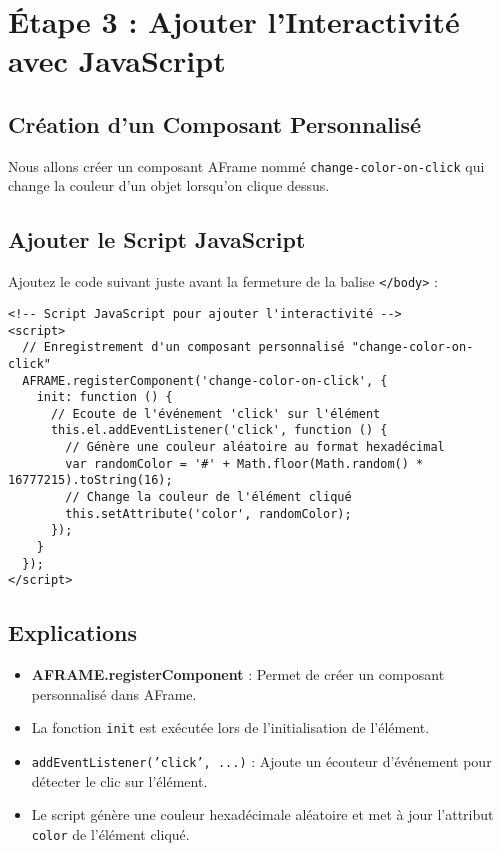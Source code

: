 \documentclass[12pt]{article}
\begin{document}
\section{Étape 3 : Ajouter l'Interactivité avec JavaScript}
\subsection{Création d'un Composant Personnalisé}
Nous allons créer un composant AFrame nommé \texttt{change-color-on-click} qui change la couleur d'un objet lorsqu'on clique dessus.

\subsection{Ajouter le Script JavaScript}
Ajoutez le code suivant juste avant la fermeture de la balise \texttt{</body>} :

\begin{verbatim}
<!-- Script JavaScript pour ajouter l'interactivité -->
<script>
  // Enregistrement d'un composant personnalisé "change-color-on-click"
  AFRAME.registerComponent('change-color-on-click', {
    init: function () {
      // Ecoute de l'événement 'click' sur l'élément
      this.el.addEventListener('click', function () {
        // Génère une couleur aléatoire au format hexadécimal
        var randomColor = '#' + Math.floor(Math.random() * 16777215).toString(16);
        // Change la couleur de l'élément cliqué
        this.setAttribute('color', randomColor);
      });
    }
  });
</script>
\end{verbatim}

\subsection{Explications}
\begin{itemize}
    \item \textbf{AFRAME.registerComponent} : Permet de créer un composant personnalisé dans AFrame.
    \item La fonction \texttt{init} est exécutée lors de l'initialisation de l'élément.
    \item \texttt{addEventListener('click', ...)} : Ajoute un écouteur d'événement pour détecter le clic sur l'élément.
    \item Le script génère une couleur hexadécimale aléatoire et met à jour l'attribut \texttt{color} de l'élément cliqué.
\end{itemize}
\end{document}
